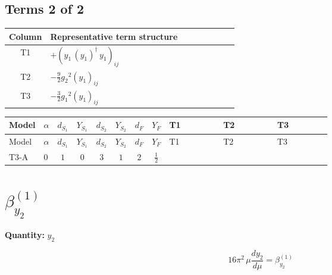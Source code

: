 \documentclass[8pt]{article}
\begin{document}
\begin{landscape}
\subsection*{Terms 2 of 2}
\begin{center}
\begin{tabular}{@{}c >{\raggedright\arraybackslash}p{0.82\linewidth}@{}}
\toprule
Column & Representative term structure \\
\midrule
T1 & \(\displaystyle +\left({y_1}\,\left({y_1}\right)^{\dagger}\,{y_1}\right)_{ij}\) \\
\midrule
T2 & \(\displaystyle -\frac{9}{2} {g_2}^2 \left({y_1}\right)_{ij}\) \\
\midrule
T3 & \(\displaystyle -\frac{3}{2} {g_1}^2 \left({y_1}\right)_{ij}\) \\
\midrule
\bottomrule
\end{tabular}
\end{center}
\smallskip
\tiny
\begin{longtable}{@{}llcccccc >{\raggedright\arraybackslash}p{0.21\linewidth} >{\raggedright\arraybackslash}p{0.21\linewidth} >{\raggedright\arraybackslash}p{0.21\linewidth}@{}}
\toprule
Model & $\alpha$ & $d_{S_1}$ & $Y_{S_1}$ & $d_{S_2}$ & $Y_{S_2}$ & $d_F$ & $Y_F$ & T1 & T2 & T3 \\
\midrule
\endfirsthead
\toprule
Model & $\alpha$ & $d_{S_1}$ & $Y_{S_1}$ & $d_{S_2}$ & $Y_{S_2}$ & $d_F$ & $Y_F$ & T1 & T2 & T3 \\
\midrule
\endhead
T3-A & $0$ & $1$ & $0$ & $3$ & $1$ & $2$ & $\frac{1}{2}$ & \scriptsize\adjustbox{max width=\linewidth}{$\begin{gathered} +\left({y_1}\,\left({y_1}\right)^{\dagger}\,{y_1}\right)_{ij}\end{gathered}$} & \scriptsize\adjustbox{max width=\linewidth}{$\begin{gathered} -\frac{9}{2} {g_2}^2 \left({y_1}\right)_{ij}\end{gathered}$} & \scriptsize\adjustbox{max width=\linewidth}{$\begin{gathered} -\frac{3}{2} {g_1}^2 \left({y_1}\right)_{ij}\end{gathered}$} \\
\midrule
\bottomrule
\end{longtable}
\clearpage
\section*{$\beta_{y_2}^{(1)}$}
\noindent\textbf{Quantity: }$y_2$\par\smallskip
\[16\pi^2\,\mu\frac{d y_2}{d\mu}=\beta_{y_2}^{(1)}\]

\end{landscape}
\end{document}
